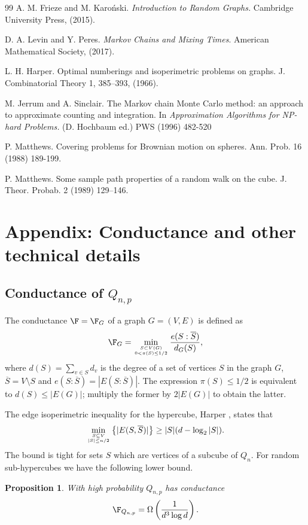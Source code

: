 \documentclass[12pt]{article}
\newtheorem{proposition}[theorem]{Proposition}
\newcommand{\ol}[1]{\overline{#1}}
\newcommand{\bfrac}[2]{\left(\frac{#1}{#2}\right)}
\def\sm{\setminus}
\begin{document}
\begin{thebibliography}{99}
 A. M. Frieze and M. Karo\'nski. {\em Introduction to Random Graphs.} Cambridge University Press, (2015).

 D. A. Levin and Y. Peres. {\em Markov Chains and Mixing Times}. American Mathematical Society, (2017).


 L. H. Harper.
Optimal numberings and isoperimetric problems on graphs. J. Combinatorial Theory 1, 385–393, (1966).


 M. Jerrum and A. Sinclair. The Markov chain Monte Carlo
method: an approach to approximate counting and integration.
In {\em Approximation Algorithms for NP-hard Problems.}
(D. Hochbaum ed.) PWS (1996) 482-520

 P. Matthews.  Covering problems for  Brownian motion on spheres.  Ann.  Prob.  16 (1988)
189-199.

 P.  Matthews. Some sample path properties of a random walk on the cube. J. Theor. Probab. 2 (1989) 129–146. %

\end{thebibliography}





\section{Appendix: Conductance and other technical details}
\subsection{Conductance of $Q_{n,p}$} \label{Conduc}


The conductance $\F=\F_G$ of a graph $G=(V,E)$ is defined as
\[
\F_G= \min_{S \subset V(G) \atop 0< \pi(S) \le 1/2} \frac{e(S:\overline S)}{d_G(S)},
\]
where $d(S)=\sum_{v\in S}d_v$ is the degree of a set of vertices $S$ in the graph $G$, $\ol S=V \sm S$ and $ e(S:\overline S)=|E(S:\overline S)|$.  The expression $\pi(S) \le 1/2$ is equivalent to $d(S)\leq |E(G)|$; multiply the former by $2|E(G)|$ to obtain the latter.

The edge isoperimetric inequality for the hypercube, Harper \cite{Har}, states that
\begin{equation}\label{Cond}
\min _{S\subseteq V
\atop |S| \le n/2}\left\{|E(S,{\overline {S}})|\right\}
\geq |S|(d-\log _{2}|S|).
\end{equation}
The bound is tight for sets
$S$ which are vertices of a subcube of $Q_n$.
For random sub-hypercubes we have the following lower bound.
\begin{proposition}\label{dubious}  With high probability $Q_{n,p}$ has conductance
\[
\F_{Q_{n,p}}=\Omega\bfrac{1}{d^3\log d}.
\]
\end{proposition}
\end{document}
